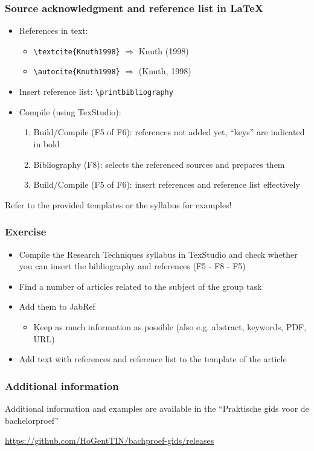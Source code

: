 \documentclass[aspectratio=169]{beamer}
\begin{document}
\begin{frame}[fragile]
  \frametitle{Source acknowledgment and reference list in {\LaTeX}}
  
  \begin{itemize}
    \item References in text:
    
    \begin{itemize}
      \item \verb|\textcite{Knuth1998}| $\Rightarrow$ Knuth (1998)
      \item \verb|\autocite{Knuth1998}| $\Rightarrow$ (Knuth, 1998)
    \end{itemize}
    
    \item Insert reference list: \verb|\printbibliography|
    
    \item Compile (using TexStudio):
    
    \begin{enumerate}
      \item Build/Compile (F5 of F6): references not added yet, ``keys'' are indicated in bold
      \item Bibliography (F8): selects the referenced sources and prepares them
      \item Build/Compile (F5 of F6): insert references and reference list effectively
    \end{enumerate}
  \end{itemize}
  
  Refer to the provided templates or the syllabus for examples!
\end{frame}

\begin{frame}
  \frametitle{Exercise}
  
  \begin{itemize}
    \item Compile the Research Techniques syllabus in TexStudio and check whether you can insert the bibliography and references 
    (F5 - F8 - F5)
    \item Find a number of articles related to the subject of the group task
    \item Add them to JabRef
    \begin{itemize}
      \item Keep as much information as possible (also e.g. abstract, keywords, PDF, URL)
    \end{itemize}
    \item Add text with references and reference list to the template of the article
  \end{itemize}
\end{frame}

\begin{frame}
  \frametitle{Additional information}
  
   Additional information and examples are available in the ``Praktische gids voor de bachelorproef''
  
  \vspace{12pt}
  
  \url{https://github.com/HoGentTIN/bachproef-gids/releases}
  
\end{frame}
\end{document}
